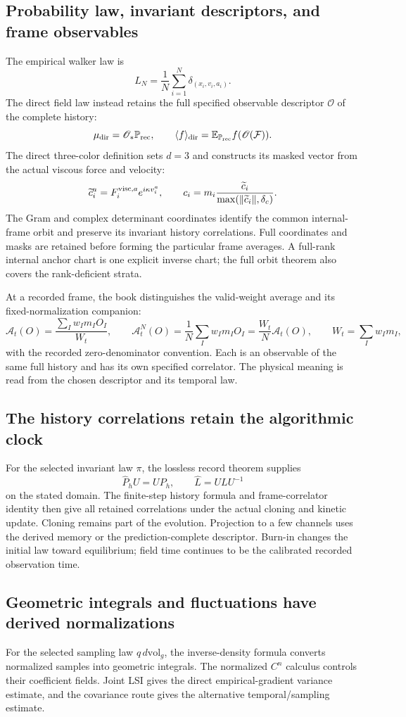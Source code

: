 \documentclass[11pt,a4paper]{article}
\begin{document}
\subsection{Probability law, invariant descriptors, and frame observables}
The empirical walker law is
\[
L_N=\frac1N\sum_{i=1}^N\delta_{(x_i,v_i,a_i)}.
\]
The direct field law instead retains the full specified observable descriptor \(\mathscr O\) of the complete history:
\[
\mu_{\rm dir}=\mathscr O_*\mathbb P_{\rm rec},\qquad
\langle f\rangle_{\rm dir}
=\mathbb E_{\mathbb P_{\rm rec}}f(\mathscr O(\mathcal F)).
\]
The direct three-color definition sets \(d=3\) and constructs its masked vector from the actual viscous force and velocity:
\[
\widetilde c_i^a=F_i^{{\rm visc},a}e^{i\kappa v_i^a},\qquad
c_i=m_i\frac{\widetilde c_i}{\max(\|\widetilde c_i\|,\delta_c)}.
\]
The Gram and complex determinant coordinates identify the common internal-frame orbit and preserve its invariant history correlations. Full coordinates and masks are retained before forming the particular frame averages. A full-rank internal anchor chart is one explicit inverse chart; the full orbit theorem also covers the rank-deficient strata.

At a recorded frame, the book distinguishes the valid-weight average and its fixed-normalization companion:
\[
\mathcal A_t(O)=\frac{\sum_Iw_Im_IO_I}{W_t},\qquad
\mathcal A_t^N(O)=\frac1N\sum_Iw_Im_IO_I
=\frac{W_t}{N}\mathcal A_t(O),\qquad W_t=\sum_Iw_Im_I,
\]
with the recorded zero-denominator convention. Each is an observable of the same full history and has its own specified correlator. The physical meaning is read from the chosen descriptor and its temporal law.

\subsection{The history correlations retain the algorithmic clock}
For the selected invariant law \(\pi\), the lossless record theorem supplies
\[
\widehat P_hU=UP_h,\qquad
\widehat L=ULU^{-1}
\]
on the stated domain. The finite-step history formula and frame-correlator identity then give all retained correlations under the actual cloning and kinetic update. Cloning remains part of the evolution. Projection to a few channels uses the derived memory or the prediction-complete descriptor. Burn-in changes the initial law toward equilibrium; field time continues to be the calibrated recorded observation time.

\subsection{Geometric integrals and fluctuations have derived normalizations}
For the selected sampling law \(q\,d\mathrm{vol}_g\), the inverse-density formula converts normalized samples into geometric integrals. The normalized \(C^n\) calculus controls their coefficient fields. Joint LSI gives the direct empirical-gradient variance estimate, and the covariance route gives the alternative temporal/sampling estimate.
\end{document}

